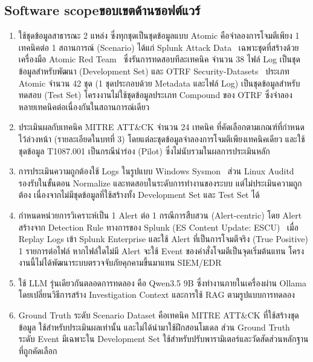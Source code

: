 \subsection{\ifenglish Software scope\else ขอบเขตด้านซอฟต์แวร์\fi}
\begin{enumerate}
    \item ใช้ชุดข้อมูลสาธารณะ 2 แหล่ง ซึ่งทุกชุดเป็นชุดข้อมูลแบบ Atomic
      คือจำลองการโจมตีเพียง 1 เทคนิคต่อ 1 สถานการณ์ (Scenario)
      ได้แก่ Splunk Attack Data~\cite{splunk-attack-data} เฉพาะชุดที่สร้างด้วยเครื่องมือ
      Atomic Red Team~\cite{atomic-red-team} ซึ่งรันการทดสอบทีละเทคนิค จำนวน 38 ไฟล์ Log
      เป็นชุดข้อมูลสำหรับพัฒนา (Development Set)
      และ OTRF Security-Datasets~\cite{otrf-security-datasets} ประเภท Atomic จำนวน 42 ชุด
      (1 ชุดประกอบด้วย Metadata และไฟล์ Log) เป็นชุดข้อมูลสำหรับทดสอบ (Test Set)
      โครงงานไม่ใช้ชุดข้อมูลประเภท Compound ของ OTRF ซึ่งจำลองหลายเทคนิคต่อเนื่องกันในสถานการณ์เดียว
      
    \item ประเมินผลกับเทคนิค MITRE ATT\&CK จำนวน 24 เทคนิค ที่คัดเลือกตามเกณฑ์ที่กำหนดไว้ล่วงหน้า
          (รายละเอียดในบทที่ 3) โดยแต่ละชุดข้อมูลจำลองการโจมตีเพียงเทคนิคเดียว
          และใช้ชุดข้อมูล T1087.001 เป็นกรณีนำร่อง (Pilot) ซึ่งไม่นับรวมในผลการประเมินหลัก

    \item การประเมินความถูกต้องใช้ Logs ในรูปแบบ Windows Sysmon~\cite{sysmon}
          ส่วน Linux Auditd~\cite{auditd} รองรับในขั้นตอน Normalize และทดสอบในระดับการทำงานของระบบ
          แต่ไม่ประเมินความถูกต้อง เนื่องจากไม่มีชุดข้อมูลที่ใช้สร้างทั้ง Development Set และ Test Set ได้

    \item กำหนดหน่วยการวิเคราะห์เป็น 1 Alert ต่อ 1 กรณีการสืบสวน (Alert-centric)
          โดย Alert สร้างจาก Detection Rule ทางการของ Splunk (ES Content Update: ESCU)~\cite{splunk-escu}
          เมื่อ Replay Logs เข้า Splunk Enterprise และใช้ Alert ที่เป็นการโจมตีจริง (True Positive) 1 รายการต่อไฟล์
          หากไฟล์ใดไม่มี Alert จะใช้ Event ของคำสั่งโจมตีเป็นจุดเริ่มต้นแทน
          โครงงานนี้ไม่ได้พัฒนาระบบตรวจจับภัยคุกคามขึ้นมาแทน SIEM/EDR

    \item ใช้ LLM รุ่นเดียวกันตลอดการทดลอง คือ Qwen3.5 9B
          ซึ่งทำงานภายในเครื่องผ่าน Ollama โดยเปลี่ยนวิธีการสร้าง
          Investigation Context และการใช้ RAG ตามรูปแบบการทดลอง

    \item Ground Truth ระดับ Scenario Dataset คือเทคนิค MITRE ATT\&CK ที่ใช้สร้างชุดข้อมูล
          ใช้สำหรับประเมินผลเท่านั้น และไม่ได้นำมาใช้ฝึกสอนโมเดล
          ส่วน Ground Truth ระดับ Event มีเฉพาะใน Development Set
          ใช้สำหรับปรับพารามิเตอร์และวัดสัดส่วนหลักฐานที่ถูกคัดเลือก


\end{enumerate}
